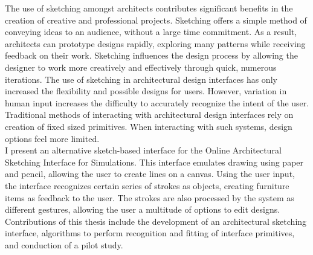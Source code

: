 
The use of sketching amongst architects contributes  significant benefits in the creation of creative and professional projects. Sketching offers a simple method of conveying ideas to an audience, without a large time commitment. As a result, architects can prototype designs rapidly, exploring many patterns while receiving feedback on their work. Sketching influences the design process by allowing the designer to work more creatively and effectively through quick, numerous iterations. The use of sketching in architectural design interfaces has only increased the flexibility and possible designs for users. However, variation in human input increases the difficulty to accurately recognize the intent of the user. Traditional methods of interacting with architectural design interfaces rely on creation of fixed sized primitives. When interacting with such systems, design options feel more limited. \\

I present an alternative sketch-based interface for the Online Architectural Sketching Interface for Simulations. This interface emulates drawing using paper and pencil, allowing the user to create lines on a canvas. Using the user input, the interface recognizes certain series of strokes as objects, creating furniture items as feedback to the user. The strokes are also processed by the system as different gestures, allowing the user a multitude of options to edit designs. \\


Contributions of this thesis include the development of an architectural sketching interface, algorithms to perform recognition and fitting of interface primitives, and conduction of a pilot study. 
